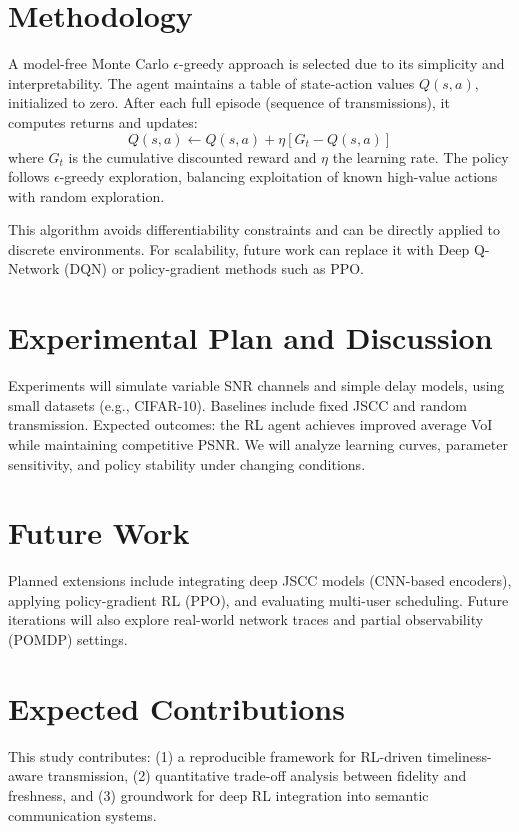\documentclass[conference]{IEEEtran}
\begin{document}
\section{Methodology}
A model-free Monte Carlo $\epsilon$-greedy approach is selected due to its simplicity and interpretability. The agent maintains a table of state-action values $Q(s,a)$, initialized to zero. After each full episode (sequence of transmissions), it computes returns and updates:
\[
Q(s,a) \leftarrow Q(s,a) + \eta [G_t - Q(s,a)]
\]
where $G_t$ is the cumulative discounted reward and $\eta$ the learning rate. The policy follows $\epsilon$-greedy exploration, balancing exploitation of known high-value actions with random exploration. 

This algorithm avoids differentiability constraints and can be directly applied to discrete environments. For scalability, future work can replace it with Deep Q-Network (DQN) or policy-gradient methods such as PPO.

\section{Experimental Plan and Discussion}
Experiments will simulate variable SNR channels and simple delay models, using small datasets (e.g., CIFAR-10). Baselines include fixed JSCC and random transmission. Expected outcomes: the RL agent achieves improved average VoI while maintaining competitive PSNR. We will analyze learning curves, parameter sensitivity, and policy stability under changing conditions.

\section{Future Work}
Planned extensions include integrating deep JSCC models (CNN-based encoders), applying policy-gradient RL (PPO), and evaluating multi-user scheduling. Future iterations will also explore real-world network traces and partial observability (POMDP) settings.

\section{Expected Contributions}
This study contributes: (1) a reproducible framework for RL-driven timeliness-aware transmission, (2) quantitative trade-off analysis between fidelity and freshness, and (3) groundwork for deep RL integration into semantic communication systems.

\balance


\end{document}

